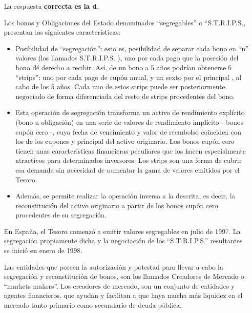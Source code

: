 \documentclass[
  letterpaper,
  DIV=11,
  numbers=noendperiod]{scrreprt}
\begin{document}
\begin{tcolorbox}[enhanced jigsaw, left=2mm, opacityback=0, colback=white, breakable, arc=.35mm, bottomrule=.15mm, rightrule=.15mm, toprule=.15mm, leftrule=.75mm, colframe=quarto-callout-tip-color-frame]
\begin{minipage}[t]{5.5mm}
\textcolor{quarto-callout-tip-color}{\faLightbulb}
\end{minipage}%
\begin{minipage}[t]{\textwidth - 5.5mm}

La respuesta \textbf{correcta es la d}.

Los bonos y Obligaciones del Estado denominados ``segregables'' o
``S.T.R.I.P.S., presentan las siguientes características:

\begin{itemize}
\item
  Posibilidad de ``segregación'': esto es, posibilidad de separar cada
  bono en ``n'' valores (los llamados S.T.R.I.P.S. ), uno por cada pago
  que la posesión del bono dé derecho a recibir. Así, de un bono a 5
  años podrían obtenerse 6 ``strips'': uno por cada pago de cupón anual,
  y un sexto por el principal , al cabo de los 5 años. Cada uno de estos
  strips puede ser posteriormente negociado de forma diferenciada del
  resto de strips procedentes del bono.
\item
  Esta operación de segregación transforma un activo de rendimiento
  explícito (bono u obligación) en una serie de valores de rendimiento
  implícito - bonos cupón cero -, cuya fecha de vencimiento y valor de
  reembolso coinciden con los de los cupones y principal del activo
  originario. Los bonos cupón cero tienen unas características
  financieras peculiares que los hacen especialmente atractivos para
  determinados inversores. Los strips son una forma de cubrir esa
  demanda sin necesidad de aumentar la gama de valores emitidos por el
  Tesoro.
\item
  Además, se permite realizar la operación inversa a la descrita, es
  decir, la reconstitución del activo originario a partir de los bonos
  cupón cero procedentes de su segregación.
\end{itemize}

En España, el Tesoro comenzó a emitir valores segregables en julio de
1997. La segregación propiamente dicha y la negociación de los
``S.T.R.I.P.S.'' resultantes se inició en enero de 1998.

Las entidades que poseen la autorización y potestad para llevar a cabo
la segregación y reconstitución de bonos, son los llamados Creadores de
Mercado o ``markets makers''. Los creadores de mercado, son un conjunto
de entidades y agentes financieros, que ayudan y facilitan a que haya
mucha más liquidez en el mercado tanto primario como secundario de deuda
pública.

\end{minipage}%
\end{tcolorbox}
\end{document}
